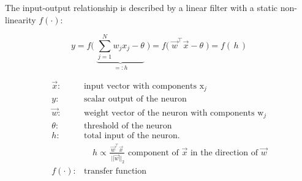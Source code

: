 \begin{frame}
    
    The input-output relationship is described by a linear filter with a static non-linearity $f(\cdot)$:

    \begin{equation}
        \label{eq:linearNeuron}
        y = f \Big(\; \underbrace{\sum_{j=1}^{N} {w}_{j} 
            {x}_j - \theta}_{=:h} \; \Big)
            = f \big(\;  \vec{w}^{\top}
            \vec{x}- \theta \; \big)
            = f(\,h\,)
    \end{equation}
    
	\[ \begin{array}{ll} 
		\vec{x}: & \text{input vector with components } \mathrm{x}_j \\
		y: & \text{scalar output of the neuron } \\
		\vec{w}: & \text{weight vector of the neuron with components }
			\mathrm{w}_{j}\\
		\theta: & \text{threshold of the neuron} \\
		h: & \text{total input of the neuron. } \\
		&\quad h \propto \frac{\vec w^\top \vec x}{\;||\vec w||_2} \text{ component of $\vec x$ in the direction of $\vec w$}\\
		f(\cdot): & \text{transfer function}
	\end{array} \]
    
\end{frame}

